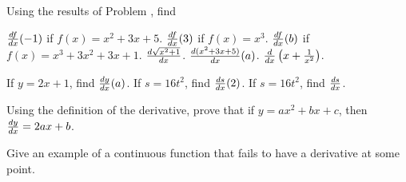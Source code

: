 \begin{exercises}
Using the results of Problem , find
\begin{exenum}
\sx
$\frac{d f}{d x} (-1)$ if $f(x) = x^2 + 3x + 5$.
\sx
$\frac{d f}{d x} (3)$ if $f(x) = x^3$.
\sx
$\frac{d f}{d x} (b)$ if $f(x) = x^3 + 3x^2 + 3x + 1$.
\sx
$\frac{d \sqrt{x^2 + 1}}{d x}$.
\sx
$\frac{d (x^2 + 3x + 5)}{d x} (a)$.
\sx
$\frac{d}{dx} \left( x + \frac1{x^2} \right) $.
\end{exenum}

\begin{exenum}
\sx
If $y = 2x + 1$, find $\frac{d y}{d x} (a)$.
\sx
If $s = 16t^2$, find $\frac{d s}{d x} (2)$.
\sx
If $s = 16t^2$, find $\frac{d s}{d x}$.
\end{exenum}

Using the definition of the derivative, prove that if
$y = ax^2 + bx + c$, then
$\frac{d y}{d x} = 2ax + b$.

Give an example of a continuous function that fails to have a derivative
at some point.

\end{exercises}
